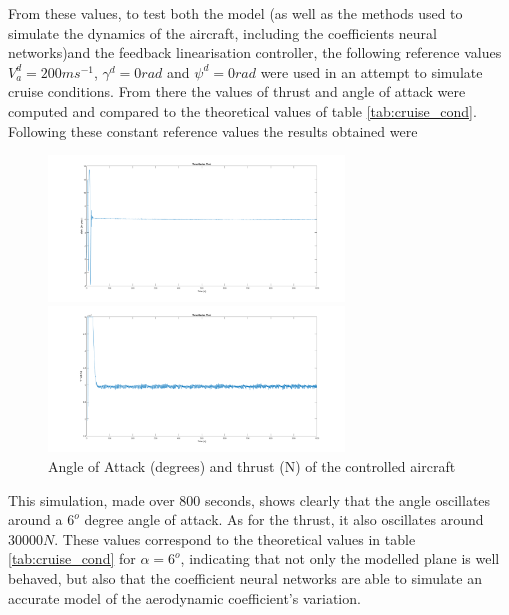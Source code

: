 From these values, to test both the model (as well as the methods used to simulate the dynamics of the aircraft, including the coefficients neural networks)and the feedback linearisation controller, the following reference values $V_a^d=200 ms^{-1}$, $\gamma^d = 0 rad$ and $\psi^d=0 rad$ were used in an attempt to simulate cruise conditions. From there the values of thrust and angle of attack were computed and  compared to the theoretical values of table \ref{tab:cruise_cond}. 
Following these constant reference values the results obtained were

\begin{figure}
\centering
\begin{minipage}{\textwidth}
\includegraphics[width=0.7\textwidth]{Figures/Results/aoa_check.PNG}
\end{minipage}
\begin{minipage}{\textwidth}
\includegraphics[width=0.7\textwidth]{Figures/Results/thrust_check.PNG}
\end{minipage}
\caption[AoA and thrust validation]{Angle of Attack (degrees) and thrust (N) of the controlled aircraft}
\end{figure}

This simulation, made over 800 seconds, shows clearly that the angle oscillates around a $6^o$ degree angle of attack. As for the thrust, it also oscillates around $30000N$. These values correspond to the theoretical values in table \ref{tab:cruise_cond} for $\alpha=6^o$, indicating that not only the modelled plane is well behaved, but also that the coefficient neural networks are able to simulate an accurate model of the aerodynamic coefficient's variation.


